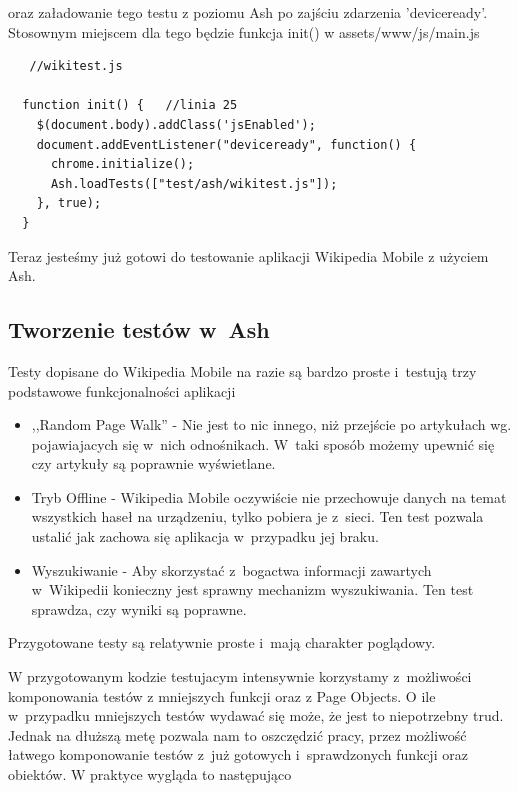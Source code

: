\documentclass[brudnopis]{xmgr}
\begin{document}
oraz załadowanie tego testu z poziomu Ash po zajściu zdarzenia 'deviceready'. Stosownym miejscem dla tego będzie funkcja init() w assets/www/js/main.js

\begin{lstlisting}
   //wikitest.js

  function init() {   //linia 25
    $(document.body).addClass('jsEnabled');
    document.addEventListener("deviceready", function() {
      chrome.initialize(); 
      Ash.loadTests(["test/ash/wikitest.js"]);
    }, true);
  }
\end{lstlisting}

Teraz jesteśmy już gotowi do testowanie aplikacji Wikipedia Mobile z użyciem Ash.

\subsection{Tworzenie testów w~Ash}

Testy dopisane do Wikipedia Mobile na razie są bardzo proste i~testują trzy podstawowe funkcjonalności aplikacji 

\begin{itemize}
  \item ,,Random Page Walk'' - Nie jest to nic innego, niż przejście po artykułach wg. pojawiajacych się w~nich odnośnikach. W~taki sposób możemy upewnić się czy artykuły są poprawnie wyświetlane.
  \item Tryb Offline - Wikipedia Mobile oczywiście nie przechowuje danych na temat wszystkich haseł na urządzeniu, tylko pobiera je z~sieci. Ten test pozwala ustalić jak zachowa się aplikacja w~przypadku jej braku.
  \item Wyszukiwanie - Aby skorzystać z~bogactwa informacji zawartych w~Wikipedii konieczny jest sprawny mechanizm wyszukiwania. Ten test sprawdza, czy wyniki są poprawne.  
\end{itemize}

Przygotowane testy są relatywnie proste i~mają charakter poglądowy. 

W przygotowanym kodzie testujacym intensywnie korzystamy z~możliwości komponowania testów z mniejszych funkcji oraz z Page Objects. O ile w~przypadku mniejszych testów wydawać się może, że jest to niepotrzebny trud. Jednak na dłuższą metę pozwala nam to oszczędzić pracy, przez możliwość łatwego komponowanie testów z~już gotowych i~sprawdzonych funkcji oraz obiektów. W praktyce wygląda to następująco
\end{document}
